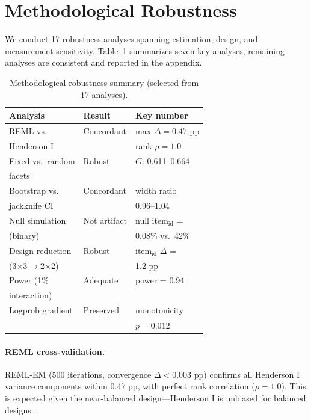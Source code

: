 \documentclass[letterpaper,11pt]{article}
\begin{document}
\section{Methodological Robustness}
\label{sec:robustness}

We conduct 17 robustness analyses spanning estimation, design, and measurement sensitivity.
Table~\ref{tab:robustness} summarizes seven key analyses; remaining analyses are consistent and reported in the appendix.

\begin{table}[t]
\centering
\caption{Methodological robustness summary (selected from 17 analyses).}
\label{tab:robustness}
\small
\begin{tabular}{lll}
\toprule
\textbf{Analysis} & \textbf{Result} & \textbf{Key number} \\
\midrule
REML vs.\ & Concordant & max $\Delta = 0.47$ pp \\
Henderson I & & rank $\rho = 1.0$ \\
\addlinespace
Fixed vs.\ random & Robust & $G$: 0.611--0.664 \\
facets & & \\
\addlinespace
Bootstrap vs.\ & Concordant & width ratio \\
jackknife CI & & 0.96--1.04 \\
\addlinespace
Null simulation & Not artifact & null item$_{\text{id}}$ = \\
(binary) & & 0.08\% vs.\ 42\% \\
\addlinespace
Design reduction & Robust & item$_{\text{id}}$ $\Delta$ = \\
(3$\times$3$\to$2$\times$2) & & 1.2 pp \\
\addlinespace
Power (1\% & Adequate & power = 0.94 \\
interaction) & & \\
\addlinespace
Logprob gradient & Preserved & monotonicity \\
& & $p = 0.012$ \\
\bottomrule
\end{tabular}
\end{table}

\paragraph{REML cross-validation.}
REML-EM (500 iterations, convergence $\Delta < 0.003$ pp) confirms all Henderson I variance components within 0.47 pp, with perfect rank correlation ($\rho = 1.0$).
This is expected given the near-balanced design---Henderson I is unbiased for balanced designs \citep{brennan2001generalizability}.
\end{document}
